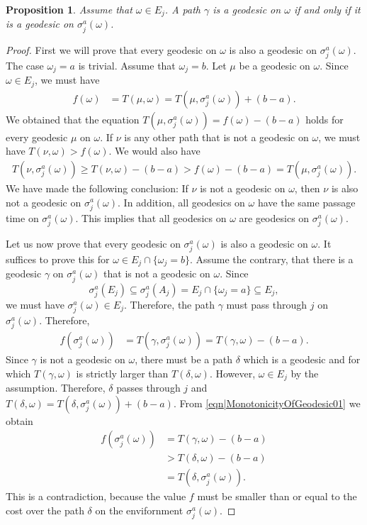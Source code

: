 \documentclass[reqno]{amsart}
\newtheorem{proposition}{Proposition}
\begin{document}
\begin{proposition} \label{thm|MonotonicityOfGeodesic} Assume that $\omega\in E_j$. A path $\gamma$ is a geodesic on $\omega$ if and only if it is a geodesic on $\sigma_j^a(\omega)$. 
\end{proposition}
\begin{proof} First we will prove that every geodesic on $\omega$ is also a geodesic on $\sigma_j^a(\omega)$. The case $\omega_j=a$ is trivial. Assume that $\omega_j=b$. Let $\mu$ be a geodesic on $\omega$. Since $\omega\in E_j$, we must have \begin{align*}f(\omega)&= T(\mu,\omega)=T(\mu,\sigma_j^a(\omega))+(b-a).\end{align*} We obtained that the equation $T(\mu,\sigma_j^a(\omega))=f(\omega)-(b-a)$ holds for every geodesic $\mu$ on $\omega$. If $\nu$ is any other path that is not a geodesic on $\omega$, we must have 
$T(\nu,\omega)>f(\omega)$. We would also have \begin{align*}T(\nu,\sigma_j^a(\omega))\geq T(\nu,\omega) -(b-a)>f(\omega)-(b-a)=T(\mu,\sigma_j^a(\omega)).\end{align*}
We have made the following conclusion: If $\nu$ is not a geodesic on $\omega$, then $\nu$ is also not a geodesic on $\sigma_j^a(\omega)$. In addition, all geodesics on $\omega$ have the same passage time 
on $\sigma_j^a(\omega)$. This implies that all geodesics on $\omega$ are geodesics on $\sigma_j^a(\omega)$. 

Let us now prove that every geodesic on $\sigma_j^a(\omega)$ is also a geodesic on $\omega$. It suffices to prove this for $\omega\in E_j\cap\{\omega_j=b\}$. Assume the contrary, that there is a geodesic $\gamma$ on $\sigma_j^a(\omega)$ that is not a geodesic on $\omega$. Since \[\sigma_j^a(E_j)\subseteq \sigma_j^a(A_j)=
E_j\cap \{\omega_j=a\}\subseteq E_j,\] we must have $\sigma_j^a(\omega)\in E_j$. Therefore, the path $\gamma$ must pass through $j$ on $\sigma_j^a(\omega)$. Therefore, 
\begin{align}
f(\sigma_j^a(\omega))&=T(\gamma,\sigma_j^a(\omega))=T(\gamma,\omega)-(b-a). \label{eqn|MonotonicityOfGeodesic01}
\end{align}
Since $\gamma$ is not a geodesic on $\omega$, there must be a path $\delta$ which is a geodesic and for which $T(\gamma,\omega)$ is strictly larger than $T(\delta,\omega)$. However, $\omega\in E_j$ by the assumption. Therefore, $\delta$ passes through $j$ and $T(\delta,\omega)=T(\delta,\sigma_j^a(\omega))+(b-a)$. From \eqref{eqn|MonotonicityOfGeodesic01} we obtain 
\begin{align*}
f(\sigma_j^a(\omega))&= T(\gamma,\omega)-(b-a)\\ &> T(\delta,\omega)-(b-a)\\
&= T(\delta,\sigma_j^a(\omega)).
\end{align*}
This is a contradiction, because the value $f$ must be smaller than or equal to the cost over the path $\delta$ on the envifornment $\sigma_j^a(\omega)$. 
\end{proof}
\end{document}

